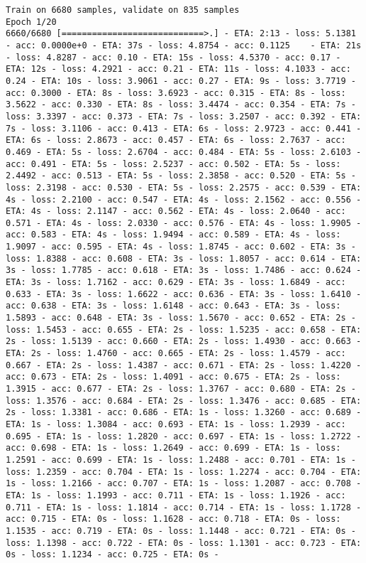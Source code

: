 \documentclass[11pt]{article}
\begin{document}
    \begin{Verbatim}[commandchars=\\\{\}]
Train on 6680 samples, validate on 835 samples
Epoch 1/20
6660/6680 [============================>.] - ETA: 2:13 - loss: 5.1381 - acc: 0.0000e+0 - ETA: 37s - loss: 4.8754 - acc: 0.1125    - ETA: 21s - loss: 4.8287 - acc: 0.10 - ETA: 15s - loss: 4.5370 - acc: 0.17 - ETA: 12s - loss: 4.2921 - acc: 0.21 - ETA: 11s - loss: 4.1033 - acc: 0.24 - ETA: 10s - loss: 3.9061 - acc: 0.27 - ETA: 9s - loss: 3.7719 - acc: 0.3000 - ETA: 8s - loss: 3.6923 - acc: 0.315 - ETA: 8s - loss: 3.5622 - acc: 0.330 - ETA: 8s - loss: 3.4474 - acc: 0.354 - ETA: 7s - loss: 3.3397 - acc: 0.373 - ETA: 7s - loss: 3.2507 - acc: 0.392 - ETA: 7s - loss: 3.1106 - acc: 0.413 - ETA: 6s - loss: 2.9723 - acc: 0.441 - ETA: 6s - loss: 2.8673 - acc: 0.457 - ETA: 6s - loss: 2.7637 - acc: 0.469 - ETA: 5s - loss: 2.6704 - acc: 0.484 - ETA: 5s - loss: 2.6103 - acc: 0.491 - ETA: 5s - loss: 2.5237 - acc: 0.502 - ETA: 5s - loss: 2.4492 - acc: 0.513 - ETA: 5s - loss: 2.3858 - acc: 0.520 - ETA: 5s - loss: 2.3198 - acc: 0.530 - ETA: 5s - loss: 2.2575 - acc: 0.539 - ETA: 4s - loss: 2.2100 - acc: 0.547 - ETA: 4s - loss: 2.1562 - acc: 0.556 - ETA: 4s - loss: 2.1147 - acc: 0.562 - ETA: 4s - loss: 2.0640 - acc: 0.571 - ETA: 4s - loss: 2.0330 - acc: 0.576 - ETA: 4s - loss: 1.9905 - acc: 0.583 - ETA: 4s - loss: 1.9494 - acc: 0.589 - ETA: 4s - loss: 1.9097 - acc: 0.595 - ETA: 4s - loss: 1.8745 - acc: 0.602 - ETA: 3s - loss: 1.8388 - acc: 0.608 - ETA: 3s - loss: 1.8057 - acc: 0.614 - ETA: 3s - loss: 1.7785 - acc: 0.618 - ETA: 3s - loss: 1.7486 - acc: 0.624 - ETA: 3s - loss: 1.7162 - acc: 0.629 - ETA: 3s - loss: 1.6849 - acc: 0.633 - ETA: 3s - loss: 1.6622 - acc: 0.636 - ETA: 3s - loss: 1.6410 - acc: 0.638 - ETA: 3s - loss: 1.6148 - acc: 0.643 - ETA: 3s - loss: 1.5893 - acc: 0.648 - ETA: 3s - loss: 1.5670 - acc: 0.652 - ETA: 2s - loss: 1.5453 - acc: 0.655 - ETA: 2s - loss: 1.5235 - acc: 0.658 - ETA: 2s - loss: 1.5139 - acc: 0.660 - ETA: 2s - loss: 1.4930 - acc: 0.663 - ETA: 2s - loss: 1.4760 - acc: 0.665 - ETA: 2s - loss: 1.4579 - acc: 0.667 - ETA: 2s - loss: 1.4387 - acc: 0.671 - ETA: 2s - loss: 1.4220 - acc: 0.673 - ETA: 2s - loss: 1.4091 - acc: 0.675 - ETA: 2s - loss: 1.3915 - acc: 0.677 - ETA: 2s - loss: 1.3767 - acc: 0.680 - ETA: 2s - loss: 1.3576 - acc: 0.684 - ETA: 2s - loss: 1.3476 - acc: 0.685 - ETA: 2s - loss: 1.3381 - acc: 0.686 - ETA: 1s - loss: 1.3260 - acc: 0.689 - ETA: 1s - loss: 1.3084 - acc: 0.693 - ETA: 1s - loss: 1.2939 - acc: 0.695 - ETA: 1s - loss: 1.2820 - acc: 0.697 - ETA: 1s - loss: 1.2722 - acc: 0.698 - ETA: 1s - loss: 1.2649 - acc: 0.699 - ETA: 1s - loss: 1.2591 - acc: 0.699 - ETA: 1s - loss: 1.2488 - acc: 0.701 - ETA: 1s - loss: 1.2359 - acc: 0.704 - ETA: 1s - loss: 1.2274 - acc: 0.704 - ETA: 1s - loss: 1.2166 - acc: 0.707 - ETA: 1s - loss: 1.2087 - acc: 0.708 - ETA: 1s - loss: 1.1993 - acc: 0.711 - ETA: 1s - loss: 1.1926 - acc: 0.711 - ETA: 1s - loss: 1.1814 - acc: 0.714 - ETA: 1s - loss: 1.1728 - acc: 0.715 - ETA: 0s - loss: 1.1628 - acc: 0.718 - ETA: 0s - loss: 1.1535 - acc: 0.719 - ETA: 0s - loss: 1.1448 - acc: 0.721 - ETA: 0s - loss: 1.1398 - acc: 0.722 - ETA: 0s - loss: 1.1301 - acc: 0.723 - ETA: 0s - loss: 1.1234 - acc: 0.725 - ETA: 0s - 
\end{Verbatim}
\end{document}

